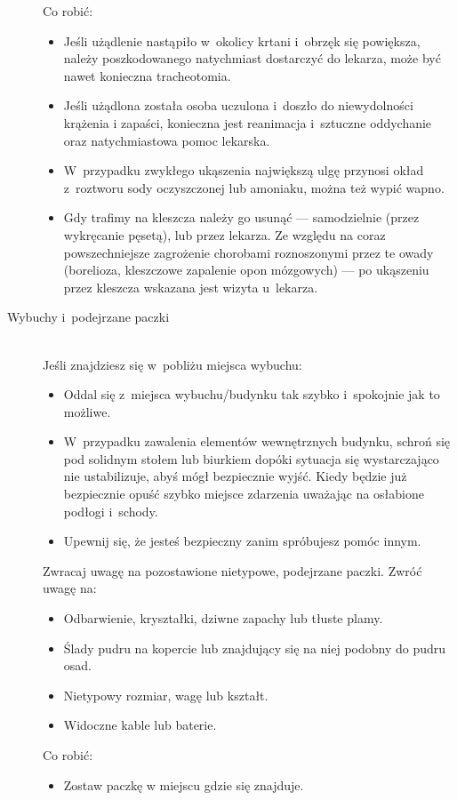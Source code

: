 \documentclass[a5paper,10pt,titlepage,twoside]{article}
\begin{document}
\begin{description}
\newpage
Co robić:
\begin{itemize}
\item Jeśli użądlenie nastąpiło w~okolicy krtani i~obrzęk się powiększa, należy poszkodowanego natychmiast dostarczyć do lekarza, może być nawet konieczna tracheotomia.
\item Jeśli użądlona została osoba uczulona i~doszło do niewydolności krążenia i zapaści, konieczna jest reanimacja i~sztuczne oddychanie oraz natychmiastowa pomoc lekarska.
\item W~przypadku zwykłego ukąszenia największą ulgę przynosi okład z~roztworu sody oczyszczonej lub amoniaku, można też wypić wapno.
\item Gdy trafimy na kleszcza należy go usunąć --- samodzielnie (przez wykręcanie pęsetą), lub przez lekarza. Ze względu na coraz powszechniejsze zagrożenie chorobami roznoszonymi przez te owady (borelioza, kleszczowe zapalenie opon mózgowych) --- po ukąszeniu przez kleszcza wskazana jest wizyta u~lekarza.
\end{itemize}
\item[Wybuchy i~podejrzane paczki] \hfill \\ Jeśli znajdziesz się w~pobliżu miejsca wybuchu:
\begin{itemize}
\item Oddal się z~miejsca wybuchu/budynku tak szybko i~spokojnie jak to możliwe.
\item W~przypadku zawalenia elementów wewnętrznych budynku, schroń się pod solidnym stołem lub biurkiem dopóki sytuacja się wystarczająco nie ustabilizuje, abyś mógł bezpiecznie wyjść. Kiedy będzie już bezpiecznie opuść szybko miejsce zdarzenia uważając na osłabione podłogi i~schody.
\item Upewnij się, że jesteś bezpieczny zanim spróbujesz pomóc innym.
\end{itemize}
Zwracaj uwagę na pozostawione nietypowe, podejrzane paczki. Zwróć uwagę na:
\begin{itemize}
\item Odbarwienie, kryształki, dziwne zapachy lub tłuste plamy.
\item Ślady pudru na kopercie lub znajdujący się na niej podobny do pudru osad.
\item Nietypowy rozmiar, wagę lub kształt.
\item Widoczne kable lub baterie.
\end{itemize}
Co robić:
\begin{itemize}
\item Zostaw paczkę w miejscu gdzie się znajduje.

\end{itemize}
\end{description}
\end{document}

